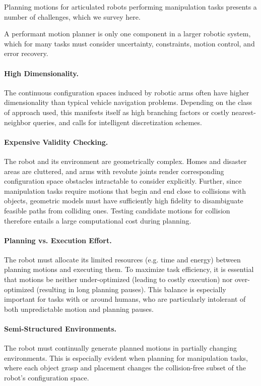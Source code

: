 Planning motions for articulated robots performing manipulation tasks
presents a number of challenges,
which we survey here.

A performant motion planner is only one component in a larger
robotic system,
which for many tasks must consider uncertainty, constraints,
motion control, and error recovery.

\paragraph{High Dimensionality.}
The continuous configuration spaces induced by robotic arms
often have higher dimensionality than typical vehicle navigation
problems.
Depending on the class of approach used,
this manifests itself as high branching factors
or costly nearest-neighbor queries,
and calls for intelligent discretization schemes.

\paragraph{Expensive Validity Checking.}
The robot and its environment are geometrically complex.
Homes and disaster areas are cluttered,
and arms with revolute joints render corresponding 
configuration space obstacles intractable to consider explicitly.
Further, since manipulation tasks require
motions that begin and end close to collisions with objects,
geometric models must have sufficiently high fidelity
to disambiguate feasible paths from colliding ones.
Testing candidate motions for collision therefore entails a
large computational cost during planning.

\paragraph{Planning vs. Execution Effort.}
The robot must allocate its limited resources
(e.g. time and energy) between planning motions and executing them.
To maximize task efficiency,
it is essential that motions be neither under-optimized
(leading to costly execution)
nor over-optimized (resulting in long planning pauses).
This balance is especially important for tasks with or around
humans,
who are particularly intolerant of both unpredictable motion
and planning pauses.

\paragraph{Semi-Structured Environments.}
The robot must continually generate planned motions in partially
changing environments.
This is especially evident when planning for manipulation tasks,
where each object grasp and placement changes the collision-free
subset of the robot's configuration space.

